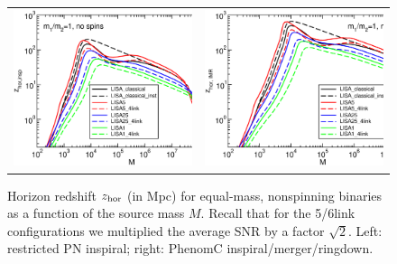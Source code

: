 \documentclass{iopart}
\begin{document}
%
\begin{figure}[H]
\begin{center}
\begin{tabular}{cc}
\includegraphics[scale=0.33,clip=true]{FigEmanuele/zhorinsp.eps}
&\includegraphics[scale=0.33,clip=true]{FigEmanuele/zhorIMR.eps}\\
\end{tabular}
\caption{\label{fig:z} Horizon redshift $z_{\rm hor}$ (in Mpc) for equal-mass,
  nonspinning binaries as a function of the source mass $M$. Recall that for
  the 5/6link configurations we multiplied the average SNR by a factor
  $\sqrt{2}$. Left: restricted PN inspiral; right: {\sc PhenomC}
  inspiral/merger/ringdown.}
\end{center}
\end{figure}
%
\end{document}
